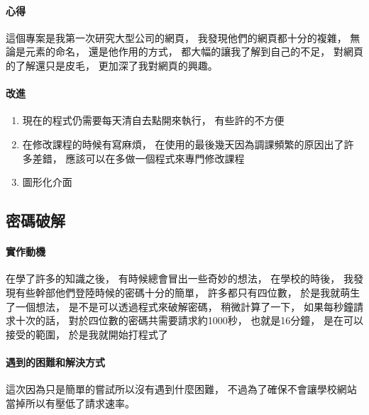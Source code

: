 \documentclass[12pt]{ctexart}
\begin{document}

\clearpage
\paragraph{心得}
\begin{adjustwidth}{2em}{0em}
這個專案是我第一次研究大型公司的網頁，
我發現他們的網頁都十分的複雜，
無論是元素的命名，
還是他作用的方式，
都大幅的讓我了解到自己的不足，
對網頁的了解還只是皮毛，
更加深了我對網頁的興趣。
\end{adjustwidth}
\paragraph{改進}
\begin{adjustwidth}{2em}{0em}
\begin{enumerate}
    \item
        現在的程式仍需要每天清自去點開來執行，
        有些許的不方便
    \item 
        在修改課程的時候有寫麻煩，
        在使用的最後幾天因為調課頻繁的原因出了許多差錯，
        應該可以在多做一個程式來專門修改課程
    \item  
        圖形化介面
\end{enumerate}
\end{adjustwidth}



\clearpage
\subsection{ 密碼破解 }
\paragraph{ 實作動機 }
\begin{adjustwidth}{2em}{0em}
    在學了許多的知識之後，
    有時候總會冒出一些奇妙的想法，
    在學校的時後，
    我發現有些幹部他們登陸時候的密碼十分的簡單，
    許多都只有四位數，
    於是我就萌生了一個想法，
    是不是可以透過程式來破解密碼，
    稍微計算了一下，
    如果每秒鐘請求十次的話，
    對於四位數的密碼共需要請求約1000秒，
    也就是16分鐘，
    是在可以接受的範圍，
    於是我就開始打程式了
\end{adjustwidth}

\paragraph{ 遇到的困難和解決方式 }
\begin{adjustwidth}{2em}{0em}
    這次因為只是簡單的嘗試所以沒有遇到什麼困難，
    不過為了確保不會讓學校網站當掉所以有壓低了請求速率。
\end{adjustwidth}
\end{document}
